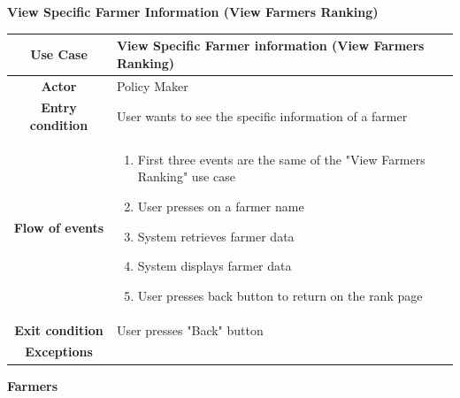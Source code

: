 \documentclass[table, 12pt]{article}
\begin{document}
\begin{itemize}
            \begin{table}[H]
                \item[] \textbf{View Specific Farmer Information (View Farmers Ranking)}
                \item[] 
                \centering
                \begin{tabular}{|c| m{}|}
                    \hline
                    \textbf{Use Case} & View Specific Farmer information (View Farmers Ranking)\\ \hline
                    \textbf{Actor} & Policy Maker\\ \hline
                    \textbf{Entry condition} & User wants to see the specific information of a farmer\\  \hline
                    \textbf{Flow of events} & \begin{enumerate}
                                                \item First three events are the same of the "View Farmers Ranking" use case 
                                                \item User presses on a farmer name
                                                \item System retrieves farmer data 
                                                \item System displays farmer data
                                                \item User presses back button to return on the rank page
                                            \end{enumerate}\\ \hline
                    \textbf{Exit condition} & User presses "Back" button\\ \hline
                    \textbf{Exceptions} &  \\ \hline                    
                \end{tabular}
            \end{table}
            
            \newpage


            \item \textbf {Farmers}


\end{itemize}
\end{document}
